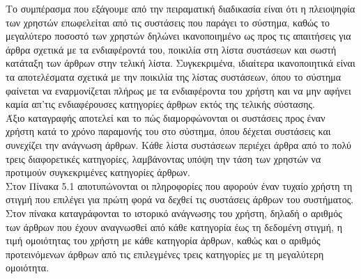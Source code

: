 Το συμπέρασμα που εξάγουμε από την πειραματική διαδικασία είναι ότι 
η πλειοψηφία των χρηστών επωφελείται από τις συστάσεις που παράγει το σύστημα, 
καθώς το μεγαλύτερο ποσοστό των χρηστών δηλώνει ικανοποιημένο ως προς τις απαιτήσεις 
για άρθρα σχετικά με τα ενδιαφέροντά του, ποικιλία στη λίστα συστάσεων 
και σωστή κατάταξη των άρθρων στην τελική λίστα. 
Συγκεκριμένα, ιδιαίτερα ικανοποιητικά είναι τα αποτελέσματα σχετικά με την ποικιλία της λίστας 
συστάσεων, όπου το σύστημα φαίνεται να εναρμονίζεται πλήρως με τα 
ενδιαφέροντα του χρήστη και να μην αφήνει καμία απ'τις ενδιαφέρουσες κατηγορίες 
άρθρων εκτός της τελικής σύστασης. \\

Άξιο καταγραφής αποτελεί και το πώς διαμορφώνονται οι συστάσεις προς έναν χρήστη 
κατά το χρόνο παραμονής του στο σύστημα, όπου δέχεται συστάσεις και συνεχίζει 
την ανάγνωση άρθρων. 
Κάθε λίστα συστάσεων περιέχει άρθρα από το πολύ τρεις διαφορετικές κατηγορίες, 
λαμβάνοντας υπόψη την τάση των χρηστών να προτιμούν συγκεκριμένες κατηγορίες άρθρων. \\

Στον Πίνακα 5.1 αποτυπώνονται οι πληροφορίες που αφορούν έναν τυχαίο χρήστη 
τη στιγμή που επιλέγει για πρώτη φορά να δεχθεί τις συστάσεις άρθρων του συστήματος. 
Στον πίνακα καταγράφονται το ιστορικό ανάγνωσης του χρήστη, 
δηλαδή ο αριθμός των άρθρων που έχουν αναγνωσθεί από κάθε κατηγορία έως τη δεδομένη στιγμή, 
η τιμή ομοιότητας του χρήστη με κάθε κατηγορία άρθρων, καθώς και ο αριθμός προτεινόμενων άρθρων 
από τις επιλεγμένες τρεις κατηγορίες με τη μεγαλύτερη ομοιότητα. \\

